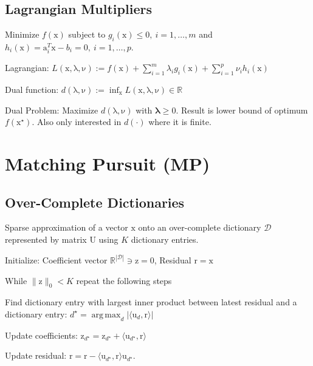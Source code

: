 \documentclass[a4paper, 11pt, landscape]{article}
\newcommand{\matr}[1]{\boldsymbol{\mathrm{#1}}}
\DeclareMathOperator*{\argmax}{arg\,max}
\begin{document}
\begin{multicols*}{3}
\subsection{Lagrangian Multipliers}
Minimize  $f(\matr{x})$ subject to $g_i(\matr{x}) \leq 0,\ i = 1, \ldots, m$ and $h_i(\matr{x}) = \matr{a}_i^T \matr{x} - b_i = 0,\ i = 1, \ldots, p$.
\begin{compactdesc}
	\item[Lagrangian:] $L(\matr{x}, \matr{\lambda}, \matr{\nu}) := f(\matr{x}) + \sum_{i=1}^m \lambda_i g_i(\matr{x}) + \sum_{i=1}^p \nu_i h_i(\matr{x})$
	\item[Dual function:] $d(\matr{\lambda}, \matr{\nu}) := \inf_{\matr{x}} L(\matr{x}, \matr{\lambda}, \matr{\nu}) \in \mathbb{R}$
	\item[Dual Problem:] Maximize $d(\matr{\lambda}, \matr{\nu})$ with $\boldsymbol{\lambda} \geq \matr{0}$. Result is lower bound of optimum $f(\matr{x}^\star)$. Also only interested in $d(\cdot)$ where it is finite.
\end{compactdesc}

\section{Matching Pursuit (MP)}
\subsection{Over-Complete Dictionaries}
Sparse approximation of a vector $\matr{x}$ onto an over-complete dictionary $\mathcal{D}$ represented by matrix $\matr{U}$ using $K$ dictionary entries.
\begin{compactenum}
	\item Initialize: Coefficient vector $\mathbb{R}^{|\mathcal{D}|} \ni \matr{z} = \matr{0}$, Residual $\matr{r} = \matr{x}$
	\item While $\|\matr{z}\|_0 < K$ repeat the following steps
	\item Find dictionary entry with largest inner product between latest residual and a dictionary entry: $d^\star = \argmax_d |\langle \matr{u}_d, \matr{r} \rangle|$
	\item Update coefficients: $\matr{z}_{d^\star} = \matr{z}_{d^\star} + \langle \matr{u}_{d^\star}, \matr{r} \rangle$
	\item Update residual: $\matr{r} = \matr{r} - \langle \matr{u}_{d^\star}, \matr{r} \rangle \matr{u}_{d^\star}$.
\end{compactenum}


\end{multicols*}
\end{document}
